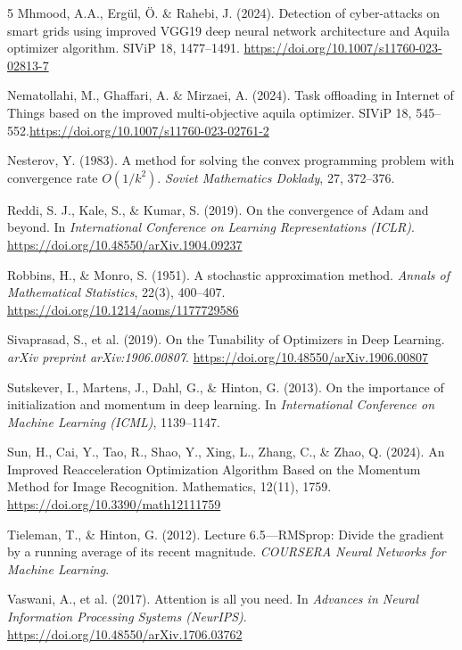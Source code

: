 \documentclass{article}
\begin{document}
\begin{thebibliography}{5}
Mhmood, A.A., Ergül, Ö. \& Rahebi, J. (2024). Detection of cyber-attacks on smart grids using improved VGG19 deep neural network architecture and Aquila optimizer algorithm. SIViP 18, 1477–1491. \url{https://doi.org/10.1007/s11760-023-02813-7}

Nematollahi, M., Ghaffari, A. \& Mirzaei, A. (2024). Task offloading in Internet of Things based on the improved multi-objective aquila optimizer. SIViP 18, 545–552.\url{https://doi.org/10.1007/s11760-023-02761-2}



Nesterov, Y. (1983). A method for solving the convex programming problem with convergence rate \( O(1/k^2) \). \textit{Soviet Mathematics Doklady}, 27, 372--376.

Reddi, S. J., Kale, S., \& Kumar, S. (2019). On the convergence of Adam and beyond. In \textit{International Conference on Learning Representations (ICLR)}. \url{https://doi.org/10.48550/arXiv.1904.09237}

Robbins, H., \& Monro, S. (1951). A stochastic approximation method. \textit{Annals of Mathematical Statistics}, 22(3), 400--407. \url{https://doi.org/10.1214/aoms/1177729586}

Sivaprasad, S., et al. (2019). On the Tunability of Optimizers in Deep Learning. \textit{arXiv preprint arXiv:1906.00807}. \url{https://doi.org/10.48550/arXiv.1906.00807}

Sutskever, I., Martens, J., Dahl, G., \& Hinton, G. (2013). On the importance of initialization and momentum in deep learning. In \textit{International Conference on Machine Learning (ICML)}, 1139--1147.

Sun, H., Cai, Y., Tao, R., Shao, Y., Xing, L., Zhang, C., \& Zhao, Q. (2024). An Improved Reacceleration Optimization Algorithm Based on the Momentum Method for Image Recognition. Mathematics, 12(11), 1759. \url{https://doi.org/10.3390/math12111759}

Tieleman, T., \& Hinton, G. (2012). Lecture 6.5—RMSprop: Divide the gradient by a running average of its recent magnitude. \textit{COURSERA Neural Networks for Machine Learning}.

Vaswani, A., et al. (2017). Attention is all you need. In \textit{Advances in Neural Information Processing Systems (NeurIPS)}. \url{https://doi.org/10.48550/arXiv.1706.03762}


\end{thebibliography}
\end{document}
